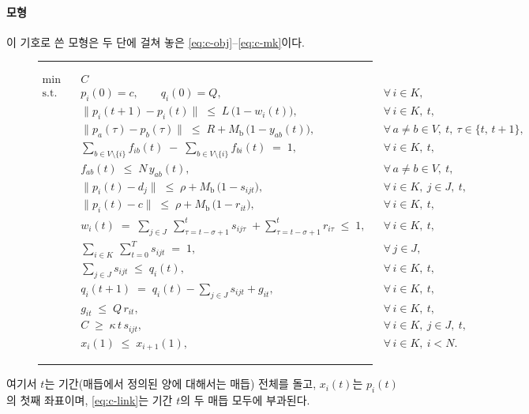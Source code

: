 \documentclass[final,5p,times,twocolumn]{elsarticle}
\begin{document}
\paragraph{모형}
이 기호로 쓴 모형은 두 단에 걸쳐 놓은 \eqref{eq:c-obj}--\eqref{eq:c-mk}이다.
\begin{figure}[!t]
\noindent\rule{\textwidth}{0.4pt}\vspace{-6pt}
\begin{align}
\min\quad & C \label{eq:c-obj}\\[3pt]
\text{s.t.}\quad & p_i(0) = c,\qquad q_i(0) = Q,
	&& \forall\, i \in K, \label{eq:c-init}\\[3pt]
& \bigl\|p_i(t+1) - p_i(t)\bigr\| \;\le\; L\,\bigl(1 - w_i(t)\bigr),
	&& \forall\, i \in K,\ t, \label{eq:c-move}\\[3pt]
& \bigl\|p_a(\tau) - p_b(\tau)\bigr\| \;\le\; R + M_{\mathrm{b}}\,\bigl(1 - y_{ab}(t)\bigr),
	&& \forall\, a \ne b \in V,\ t,\ \tau \in \{t,\, t+1\}, \label{eq:c-link}\\[3pt]
& \sum_{b \in V \setminus \{i\}} f_{ib}(t) \;-\; \sum_{b \in V \setminus \{i\}} f_{bi}(t) \;=\; 1,
	&& \forall\, i \in K,\ t, \label{eq:c-cons}\\[3pt]
& f_{ab}(t) \;\le\; N\,y_{ab}(t),
	&& \forall\, a \ne b \in V,\ t, \label{eq:c-flow}\\[3pt]
& \bigl\|p_i(t) - d_j\bigr\| \;\le\; \rho + M_{\mathrm{b}}\,\bigl(1 - s_{ijt}\bigr),
	&& \forall\, i \in K,\ j \in J,\ t, \label{eq:c-serve}\\[3pt]
& \bigl\|p_i(t) - c\bigr\| \;\le\; \rho + M_{\mathrm{b}}\,\bigl(1 - r_{it}\bigr),
	&& \forall\, i \in K,\ t, \label{eq:c-reload}\\[3pt]
& w_i(t) \;=\; \sum_{j \in J}\ \sum_{\tau = t-\sigma+1}^{t} s_{ij\tau} \;+ \sum_{\tau = t-\sigma+1}^{t} r_{i\tau} \;\le\; 1,
	&& \forall\, i \in K,\ t, \label{eq:c-window}\\[3pt]
& \sum_{i \in K}\ \sum_{t = 0}^{T} s_{ijt} \;=\; 1,
	&& \forall\, j \in J, \label{eq:c-once}\\[3pt]
& \sum_{j \in J} s_{ijt} \;\le\; q_i(t),
	&& \forall\, i \in K,\ t, \label{eq:c-cap}\\[3pt]
& q_i(t+1) \;=\; q_i(t) - \sum_{j \in J} s_{ijt} + g_{it},
	&& \forall\, i \in K,\ t, \label{eq:c-cargo}\\[3pt]
& g_{it} \;\le\; Q\,r_{it},
	&& \forall\, i \in K,\ t, \label{eq:c-gcap}\\[3pt]
& C \;\ge\; \kappa\,t\,s_{ijt},
	&& \forall\, i \in K,\ j \in J,\ t, \label{eq:c-mspan}\\[3pt]
& x_i(1) \;\le\; x_{i+1}(1),
	&& \forall\, i \in K,\ i < N. \label{eq:c-mk}
\end{align}
\noindent\rule{\textwidth}{0.4pt}
\end{figure}
여기서 $t$는 기간(매듭에서 정의된 양에 대해서는 매듭) 전체를 돌고, $x_i(t)$는 $p_i(t)$의 첫째
좌표이며, \eqref{eq:c-link}는 기간 $t$의 두 매듭 모두에 부과된다.
\end{document}
